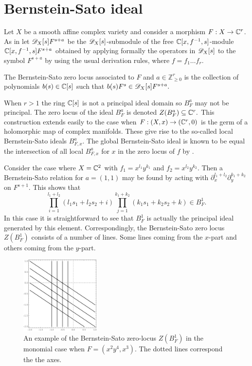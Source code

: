 \section{Bernstein-Sato ideal}\label{sec: BSIdeal}
Let $X$ be a smooth affine complex variety and consider a morphism $F:X\to \mathbb{C}^r$.
As in  let $\mathscr{D}_X[s]F^{s+a}$ be the $\mathscr{D}_X[s]$-submodule of the free $\mathbb{C}[x,f^{-1},s]$-module $\mathbb{C}[x,f^{-1},s]F^{s+a}$ obtained by applying formally the operators in $\mathscr{D}_X[s]$ to the symbol $F^{s+a}$ by using the usual derivation rules, where $f=f_1\ldots f_r$.
\begin{definition}
  The Bernstein-Sato zero locus associated to $F$ and $a\in \mathbb{Z}_{\geq 0}^r$ is the collection of polynomials $b(s)\in \mathbb{C}[s]$ such that $b(s)F^s \in  \mathscr{D}_X[s]F^{s+a}.$
\end{definition}
When $r>1$ the ring $\mathbb{C}[s]$ is not a principal ideal domain so $B_F^{a}$ may not be principal.
The zero locus of the ideal $B_F^a$ is denoted $Z(B_F^a)\subseteq \mathbb{C}^r.$
This construction extends easily to the case when $F:(X,x)\to (\mathbb{C}^r,0)$ is the germ of a holomorphic map of complex manifolds.
These give rise to the so-called local Bernstein-Sato ideals $B_{F,x}^a$.
The global Bernstein-Sato ideal is known to be equal the intersection of all local $B_{F,x}^a$ for $x$ in the zero locus of $f$ by \cite{brianccon2002remarques}.
\begin{example}
  Consider the case where $X=\mathbb{C}^2$ with $f_1 = x^{l_1}y^{k_1}$ and $f_2 = x^{l_2}y^{k_2}$.
  Then a Bernstein-Sato relation for $a = (1,1)$ may be found by acting with $\partial_x^{l_1 + l_2}\partial_y^{k_1 + k_2}$ on $F^{s+1}$.
  This shows that
  $$\prod_{i=1}^{l_1 + l_2}(l_1 s_1 + l_2 s_2 + i) \prod_{j=1}^{k_1 + k_2}  (k_1s_1 + k_2 s_2 + k) \in B_F^{1}.$$
  In this case it is straightforward to see that $B_F^{1}$ is actually the principal ideal generated by this element.
  Correspondingly, the Bernstein-Sato zero locus $Z(B_F^1)$ consists of a number of lines.
  Some lines coming from the $x$-part and others coming from the $y$-part.
  \begin{figure}[h!]
    \centering
    \includegraphics[width =4cm ]{Figures/MonomialBS2}
    \caption{An example of the Bernstein-Sato zero-locus $Z(B_F^1)$ in the monomial case when $F = (x^2y^4, x^3)$. The dotted lines correspond the the axes.}
  \end{figure}
  \end{example}
